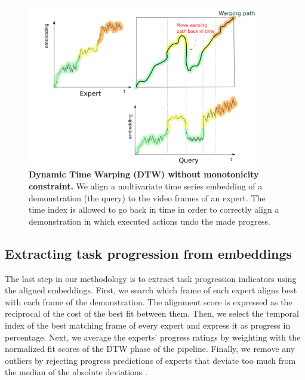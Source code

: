 \documentclass[\home/main.tex]{subfiles}
\begin{document}
\begin{figure}[htbp]
    \centering
    \includegraphics[width=0.90\textwidth, keepaspectratio]{figures/figs_dtw_backwards_v05.png}
    \caption[Dynamic Time Warping (DTW) without monotonicity constraint.]{\textbf{Dynamic Time Warping (DTW) without monotonicity constraint.} We align a multivariate time series embedding of a demonstration (the query) to the video frames of an expert. The time index is allowed to go back in time in order to correctly align a demonstration in which executed actions undo the made progress.}
    \label{fig:dtw}
\end{figure}

\subsection{Extracting task progression from embeddings} \label{subsec:rewards_extract}
The last step in our methodology is to extract task progression indicators using the aligned embeddings. First, we search which frame of each expert aligns best with each frame of the demonstration. The alignment score is expressed as the reciprocal of the cost of the best fit between them. Then, we select the temporal index of the best matching frame of every expert and express it as progress in percentage. Next, we average the experts' progress ratings by weighting with the normalized fit scores of the DTW phase of the pipeline. Finally, we remove any outliers by rejecting progress predictions of experts that deviate too much from the median of the absolute deviations \autocite{Leys2013}.

\end{document}
